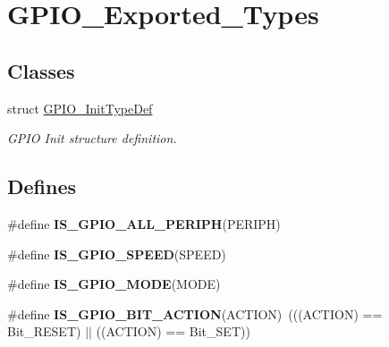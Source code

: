 \hypertarget{group__GPIO__Exported__Types}{
\section{GPIO\_\-Exported\_\-Types}
\label{group__GPIO__Exported__Types}
}
\subsection*{Classes}
\begin{DoxyCompactItemize}
\item 
struct \hyperlink{structGPIO__InitTypeDef}{GPIO\_\-InitTypeDef}
\begin{DoxyCompactList}\small\item\em GPIO Init structure definition. \item\end{DoxyCompactList}\end{DoxyCompactItemize}
\subsection*{Defines}
\begin{DoxyCompactItemize}
\item 
\#define {\bfseries IS\_\-GPIO\_\-ALL\_\-PERIPH}(PERIPH)
\item 
\#define {\bfseries IS\_\-GPIO\_\-SPEED}(SPEED)
\item 
\#define {\bfseries IS\_\-GPIO\_\-MODE}(MODE)
\item 
\hypertarget{group__GPIO__Exported__Types_ga6b882caa8ed9857c5c7267959a7818c5}{
\#define {\bfseries IS\_\-GPIO\_\-BIT\_\-ACTION}(ACTION)~(((ACTION) == Bit\_\-RESET) $|$$|$ ((ACTION) == Bit\_\-SET))}
\label{group__GPIO__Exported__Types_ga6b882caa8ed9857c5c7267959a7818c5}

\end{DoxyCompactItemize}

